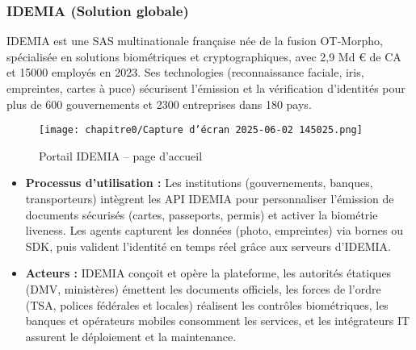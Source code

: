 \subsubsection{IDEMIA (Solution globale)}
IDEMIA\cite{b3,b30} est une SAS multinationale française née de la fusion OT‑Morpho\cite{b31}, spécialisée en solutions biométriques et cryptographiques, avec 2{,}9 Md € de CA et 15000 employés en 2023\cite{b32}. Ses technologies (reconnaissance faciale, iris, empreintes, cartes à puce) sécurisent l’émission et la vérification d’identités pour plus de 600 gouvernements et 2300 entreprises dans 180 pays\cite{b33}.\\
\begin{figure}[H]
  \centering
  \texttt{[image: chapitre0/Capture d'écran 2025-06-02 145025.png]}
  \caption{Portail IDEMIA – page d’accueil}
\end{figure}
\begin{itemize}[label=\textbullet]
  \item \textbf{Processus d'utilisation :} Les institutions (gouvernements, banques, transporteurs) intègrent les API IDEMIA pour personnaliser l’émission de documents sécurisés (cartes, passeports, permis) et activer la biométrie liveness\cite{b34}. Les agents capturent les données (photo, empreintes) via bornes ou SDK, puis valident l’identité en temps réel grâce aux serveurs d’IDEMIA\cite{b34}.
  \item \textbf{Acteurs :} IDEMIA conçoit et opère la plateforme, les autorités étatiques (DMV, ministères) émettent les documents officiels, les forces de l’ordre (TSA, polices fédérales et locales) réalisent les contrôles biométriques, les banques et opérateurs mobiles consomment les services, et les intégrateurs IT assurent le déploiement et la maintenance\cite{b35}.
\end{itemize}

